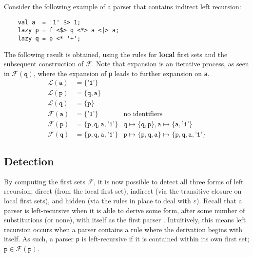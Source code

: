 Consider the following example of a parser that contains indirect left recursion:

\begin{verbatim}
    val a  = '1' $> 1;
    lazy p = f <$> q <*> a <|> a;
    lazy q = p <* '+';
\end{verbatim}

The following result is obtained, using the rules for \textbf{local} first sets and the subsequent construction of $\mathcal{F}$.
Note that expansion is an iterative process, as seen in $\mathcal{F}(\texttt{q})$, where the expansion of \texttt{p} leads to further expansion on \texttt{a}.
\begin{align*}
    \mathcal{L}(\texttt{a}) & = \{ \texttt{'1'} \} \\
    \mathcal{L}(\texttt{p}) & = \{ \texttt{q}, \texttt{a} \} \\
    \mathcal{L}(\texttt{q}) & = \{ \texttt{p} \} \\
    \mathcal{F}(\texttt{a}) & = \{ \texttt{'1'} \} & \text{no identifiers} \\
    \mathcal{F}(\texttt{p}) & = \{ \texttt{p}, \texttt{q}, \texttt{a}, \texttt{'1'} \} & \texttt{q} \mapsto \{ \texttt{q}, \texttt{p} \}, \texttt{a} \mapsto \{ \texttt{a}, \texttt{'1'} \} \\
    \mathcal{F}(\texttt{q}) & = \{ \texttt{p}, \texttt{q}, \texttt{a}, \texttt{'1'} \} & \texttt{p} \mapsto \{ \texttt{p}, \texttt{q}, \texttt{a} \} \mapsto \{ \texttt{p}, \texttt{q}, \texttt{a}, \texttt{'1'} \}
\end{align*}

\subsection{Detection}
\label{ssec:lrec_detection}

By computing the first sets $\mathcal{F}$, it is now possible to detect all three forms of left recursion; direct (from the local first set), indirect (via the transitive closure on local first sets), and hidden (via the rules in place to deal with $\varepsilon$).
Recall that a parser is left-recursive when it is able to derive some form, after some number of substitutions (or none), with itself as the first parser \cite{power99}.
Intuitively, this means left recursion occurs when a parser contains a rule where the derivation begins with itself.
As such, a parser \texttt{p} is left-recursive if it is contained within its own first set; $\texttt{p} \in \mathcal{F}(\texttt{p})$.

